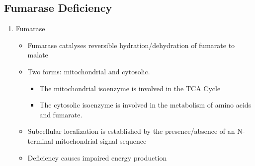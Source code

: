 \documentclass{scrartcl}
\begin{document}
\subsection{Fumarase Deficiency}
\label{sec:orgad9af32}
\begin{enumerate}
\item Fumarase
\label{sec:orga32d077}
\begin{itemize}
\item Fumarase catalyses reversible hydration/dehydration of fumarate to malate
\item Two forms: mitochondrial and cytosolic.
\begin{itemize}
\item The mitochondrial isoenzyme is involved in the TCA Cycle
\item The cytosolic isoenzyme is involved in the metabolism of amino acids and fumarate.
\end{itemize}
\item Subcellular localization is established by the presence/absence of an N-terminal mitochondrial signal
sequence
\item Deficiency causes impaired energy production
\end{itemize}


\end{enumerate}
\end{document}
